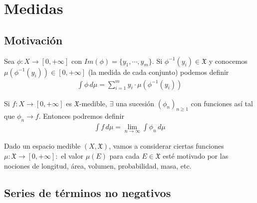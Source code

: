 \section{Medidas}

\subsection{Motivación}
Sea $\phi: X \to [0, +\infty]$ con $Im(\phi) = \{ y_1, \cdots, y_m \}$. Si $\phi^{-1}(y_i) \in \mathfrak{X}$ y conocemos
$\mu(\phi^{-1}(y_i)) \in [0, +\infty]$ (la medida de cada conjunto) podemos definir \begin{align*}
    \int \phi \,d\mu = \sum_{i=1}^m y_i \cdot \mu(\phi^{-1}(y_i))
\end{align*}

Si $f: X \to [0, +\infty]$ es $\mathfrak{X}$-medible, $\exists$ una sucesión $(\phi_n)_{n \geq 1}$ con funciones así tal que $\phi_n \to f$. Entonces podremos definir
\begin{align*}
    \int f \,d\mu = \lim_{n \to \infty} \int \phi_n \,d\mu
\end{align*}

Dado un espacio medible $(X, \mathfrak{X})$, vamos a considerar ciertas funciones $\mu : \mathfrak{X} \to [0, +\infty] : $ el valor $\mu(E)$ para cada $E \in \mathfrak{X}$
esté motivado por las nociones de longitud, área, volumen, probabilidad, masa, etc.

\clearpage

\subsection{Series de términos no negativos}

